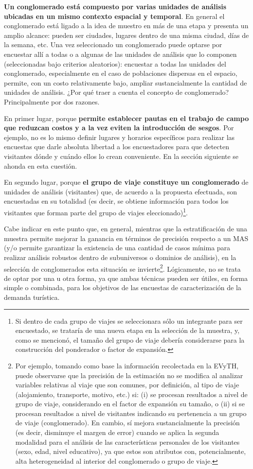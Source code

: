 \documentclass[
]{book}
\begin{document}
\textbf{Un conglomerado está compuesto por varias unidades de análisis ubicadas en un mismo contexto espacial y temporal}. En general el conglomerado está ligado a la idea de muestro en más de una etapa y presenta un amplio alcance: pueden ser ciudades, lugares dentro de una misma ciudad, días de la semana, etc. Una vez seleccionado un conglomerado puede optarse por encuestar allí a todas o a algunas de las unidades de análisis que lo componen (seleccionadas bajo criterios aleatorios): encuestar a todas las unidades del conglomerado, especialmente en el caso de poblaciones dispersas en el espacio, permite, con un costo relativamente bajo, ampliar sustancialmente la cantidad de unidades de análisis. ¿Por qué traer a cuenta el concepto de conglomerado? Principalmente por dos razones.

En primer lugar, porque \textbf{permite establecer pautas en el trabajo de campo que reduzcan costos y a la vez eviten la introducción de sesgos}. Por ejemplo, no es lo mismo definir lugares y horarios específicos para realizar las encuestas que darle absoluta libertad a los encuestadores para que detecten visitantes dónde y cuándo ellos lo crean conveniente. En la sección siguiente se ahonda en esta cuestión.

En segundo lugar, porque \textbf{el grupo de viaje constituye un conglomerado} de unidades de análisis (visitantes) que, de acuerdo a la propuesta efectuada, son encuestadas en su totalidad (es decir, se obtiene información para todos los visitantes que forman parte del grupo de viajes eleccionado)\footnote{Si dentro de cada grupo de viajes se seleccionara sólo un integrante para ser encuestado, se trataría de una nueva etapa en la selección de la muestra, y, como se mencionó, el tamaño del grupo de viaje debería considerarse para la construcción del ponderador o factor de expansión.}.

Cabe indicar en este punto que, en general, mientras que la estratificación de una muestra permite mejorar la ganancia en términos de precisión respecto a un MAS (y/o permite garantizar la existencia de una cantidad de casos mínima para realizar análisis robustos dentro de subuniversos o dominios de análisis), en la selección de conglomerados esta situación se invierte\footnote{Por ejemplo, tomando como base la información recolectada en la EVyTH, puede observarse que la precisión de la estimación no se modifica al analizar variables relativas al viaje que son comunes, por definición, al tipo de viaje (alojamiento, transporte, motivo, etc.) si: (i) se procesan resultados a nivel de grupo de viaje, considerando en el factor de expansión su tamaño, o (ii) si se procesan resultados a nivel de visitantes indicando su pertenencia a un grupo de viaje (conglomerado). En cambio, sí mejora sustancialmente la precisión (es decir, disminuye el margen de error) cuando se aplica la segunda modalidad para el análisis de las características personales de los visitantes (sexo, edad, nivel educativo), ya que estos son atributos con, potencialmente, alta heterogeneidad al interior del conglomerado o grupo de viaje.}. Lógicamente, no se trata de optar por una u otra forma, ya que ambas técnicas pueden ser útiles, en forma simple o combinada, para los objetivos de las encuestas de caracterización de la demanda turística.
\end{document}
